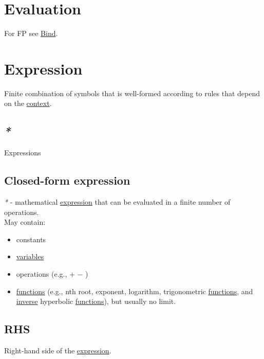 \documentclass[a4paper,14pt,oneside]{book}
\begin{document}
\chapter{\label{org08c8fba}Evaluation}
\label{sec:orgb0181db}
For FP see \hyperref[orgfd2c016]{Bind}.\\

\chapter{\label{org4eaaefd}Expression}
\label{sec:org02c750a}
Finite combination of symbols that is well-formed according to rules that depend on the \hyperref[org897f4e7]{context}.\\

\section{\emph{*}}
\label{sec:orgef40f64}

\label{orgf28b2f4}Expressions\\

\section{\label{org8da0951}Closed-form expression}
\label{sec:org6eaf73a}
\emph{*} - mathematical \hyperref[org4eaaefd]{expression} that can be evaluated in a finite number of operations.\\

May contain:\\
\begin{itemize}
\item constants\\
\item \hyperref[org1f76999]{variables}\\
\item operations (e.g., + − \texttimes{} \textdiv{})\\
\item \hyperref[orgcfd72f2]{functions} (e.g., nth root, exponent, logarithm, trigonometric \hyperref[orgcfd72f2]{functions}, and \hyperref[orge6d8fc9]{inverse} hyperbolic \hyperref[orgcfd72f2]{functions}), but usually no limit.\\
\end{itemize}

\section{\label{org7300bbe}RHS}
\label{sec:orgb460005}
Right-hand side of the \hyperref[org4eaaefd]{expression}.\\
\end{document}
